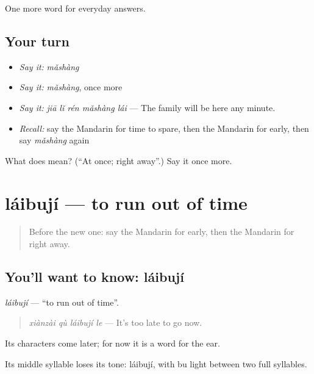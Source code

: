 \begin{grammarlens}[title={What you've built}]
One more word for everyday answers.
\end{grammarlens}

\subsection*{Your turn}
\begin{itemize}
\raggedright
  \item \emph{Say it:} \emph{mǎshàng}
  \item \emph{Say it:} \emph{mǎshàng}, once more
  \item \emph{Say it:} \emph{jiā lǐ rén mǎshàng lái} — The family will be here any minute.
  \item \emph{Recall:} say the Mandarin for time to spare, then the Mandarin for early, then say \emph{mǎshàng} again
\end{itemize}

\begin{tcolorbox}[breakable,colback=teal!4,colframe=teal!35!black,title={Before you move on}]
What does  mean? (\textquotedblleft{}At once; right away\textquotedblright{}.) Say it once more.
\end{tcolorbox}
\section[láibují]{láibují — to run out of time}

\label{lesson:ZH-C83-laibuji}



\begin{quote}
Before the new one: say the Mandarin for early, then the Mandarin for right away.
\end{quote}

\subsection*{You'll want to know: láibují}
\emph{láibují} — \textquotedblleft{}to run out of time\textquotedblright{}.

\begin{quote}
\emph{xiànzài qù láibují le} — It's too late to go now.
\end{quote}

Its characters come later; for now it is a word for the ear.

Its middle syllable loses its tone: láibují, with bu light between two full syllables.

